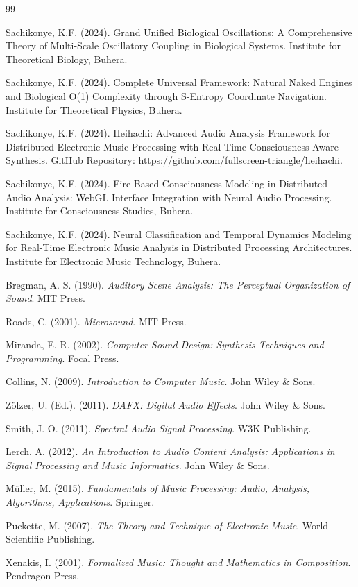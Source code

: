 \documentclass[12pt,a4paper]{article}
\begin{document}
\begin{thebibliography}{99}

Sachikonye, K.F. (2024). Grand Unified Biological Oscillations: A Comprehensive Theory of Multi-Scale Oscillatory Coupling in Biological Systems. Institute for Theoretical Biology, Buhera.

Sachikonye, K.F. (2024). Complete Universal Framework: Natural Naked Engines and Biological O(1) Complexity through S-Entropy Coordinate Navigation. Institute for Theoretical Physics, Buhera.

Sachikonye, K.F. (2024). Heihachi: Advanced Audio Analysis Framework for Distributed Electronic Music Processing with Real-Time Consciousness-Aware Synthesis. GitHub Repository: https://github.com/fullscreen-triangle/heihachi.

Sachikonye, K.F. (2024). Fire-Based Consciousness Modeling in Distributed Audio Analysis: WebGL Interface Integration with Neural Audio Processing. Institute for Consciousness Studies, Buhera.

Sachikonye, K.F. (2024). Neural Classification and Temporal Dynamics Modeling for Real-Time Electronic Music Analysis in Distributed Processing Architectures. Institute for Electronic Music Technology, Buhera.

Bregman, A. S. (1990). \textit{Auditory Scene Analysis: The Perceptual Organization of Sound}. MIT Press.

Roads, C. (2001). \textit{Microsound}. MIT Press.

Miranda, E. R. (2002). \textit{Computer Sound Design: Synthesis Techniques and Programming}. Focal Press.

Collins, N. (2009). \textit{Introduction to Computer Music}. John Wiley \& Sons.

Zölzer, U. (Ed.). (2011). \textit{DAFX: Digital Audio Effects}. John Wiley \& Sons.

Smith, J. O. (2011). \textit{Spectral Audio Signal Processing}. W3K Publishing.

Lerch, A. (2012). \textit{An Introduction to Audio Content Analysis: Applications in Signal Processing and Music Informatics}. John Wiley \& Sons.

Müller, M. (2015). \textit{Fundamentals of Music Processing: Audio, Analysis, Algorithms, Applications}. Springer.

Puckette, M. (2007). \textit{The Theory and Technique of Electronic Music}. World Scientific Publishing.

Xenakis, I. (2001). \textit{Formalized Music: Thought and Mathematics in Composition}. Pendragon Press.

\end{thebibliography}
\end{document}
